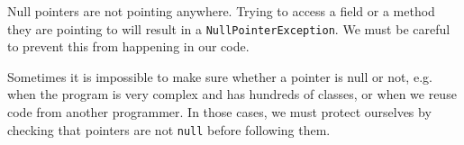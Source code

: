 Null pointers are not pointing anywhere. Trying to access a field or a
method they are pointing to will result in a
\verb+NullPointerException+. We must be careful to prevent this from
happening in our code. 

Sometimes it is impossible to make sure whether a pointer is null or
not, e.g. when the program is very complex and has hundreds of
classes, or when we reuse code from another programmer. In those
cases, we must protect ourselves by checking that pointers are not
\verb+null+ before following them. 



